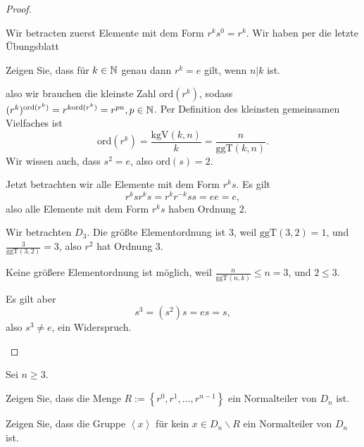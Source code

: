 \begin{proof}
	\begin{parts}
	\item Wir betracten zuerst Elemente mit dem Form $r^ks^0=r^k$. Wir haben per die letzte Übungsblatt
		\begin{tcolorbox}
			Zeigen Sie, dass für $k \in \mathbb{N}$ genau dann $r^k = e$ gilt, wenn $n|k$ ist.
		\end{tcolorbox}
		also wir brauchen die kleinste Zahl $\text{ord}(r^k)$, sodass $(r^k)^{\text{ord}(r^k)}=r^{k\text{ord}(r^k)}=r^{pn},p\in \mathbb{N}$. Per Definition des kleinsten gemeinsamen Vielfaches ist
		\[
			\text{ord}(r^k)=\frac{\text{kgV}(k, n)}{k}=\frac{n}{\text{ggT}(k,n)}
		.\] 
		Wir wissen auch, dass $s^2=e$, also $\text{ord}(s)=2$.
		
		Jetzt betrachten wir alle Elemente mit dem Form $r^ks$. Es gilt
		\[
			r^ks r^k s=r^kr^{-k}s s=ee=e
		,\]
		also alle Elemente mit dem Form $r^ks$ haben Ordnung $2$.
	\item Wir betrachten $D_3$. Die größte Elementordnung ist $3$, weil $\text{ggT}(3,2)=1$, und $\frac{3}{\text{ggT}(3,2)}=3$, also $r^2$ hat Ordnung $3$.

		Keine größere Elementordnung ist möglich, weil $\frac{n}{\text{ggT}(n,k)}\le n=3$, und $2 \le 3$. 

		Es gilt aber
		\[
		s^3=(s^2)s=es=s
		,\]
		also $s^3\neq e$, ein Widerspruch.\qedhere
	\end{parts}
\end{proof}
\begin{Problem}
	Sei $n\ge 3$. 
	\begin{parts}
	\item Zeigen Sie, dass die Menge $R:=\left\{ r^0, r^1, \dots, r^{n-1} \right\} $ ein Normalteiler von $D_n$ ist.
	\item Zeigen Sie, dass die Gruppe $\left<x \right>$ f\"{u}r kein $x\in D_n\backslash R$ ein Normalteiler von $D_n$ ist.
	\end{parts}
\end{Problem}
